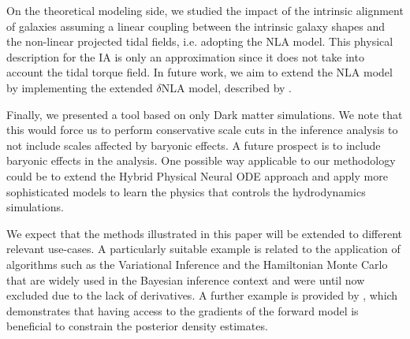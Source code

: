 \documentclass[twocolumn,twocolappendix]{aastex63}
\begin{document}
On the theoretical modeling side, we studied the impact of the intrinsic alignment of galaxies assuming a linear coupling between the intrinsic galaxy shapes and the non-linear projected tidal fields, i.e. adopting the NLA model. This physical description for the IA is only an approximation since it does not take into account the tidal torque field.
In future work, we aim to extend the NLA model by implementing the extended $\delta$NLA model, described by \cite{harnois2021cosmic}. 


Finally, we presented a tool based on only Dark matter simulations. We note that this would force us to perform conservative scale cuts in the inference analysis to not include scales affected by baryonic effects.
 A future prospect is to include baryonic effects in the analysis. One possible way applicable to our methodology  could be to extend the Hybrid Physical Neural ODE approach and apply more sophisticated models to learn the physics that controls the hydrodynamics simulations.



We expect that the methods illustrated in this paper will be extended to different relevant use-cases. A particularly suitable example is related to the application of algorithms such as the Variational Inference and the Hamiltonian Monte Carlo that are widely used in the Bayesian inference context and were until now excluded due to the lack of derivatives. 
A further example is provided by \cite{zeghal2022neural}, which demonstrates that having access to the gradients of the forward model is beneficial to constrain the posterior density estimates.
\end{document}
